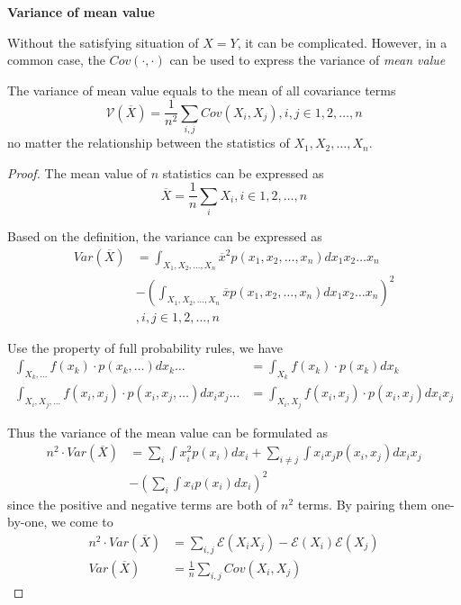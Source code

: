 \documentclass[../main.tex]{subfiles}
\begin{document}
\bigbreak
\textbf{Variance of mean value}

Without the satisfying situation of $X=Y$, it can be complicated.
However, in a common case, the $Cov(\cdot, \cdot)$ can be used to express the variance of \emph{mean value}
\begin{lemma}
    \label{Lemma: Variance of mean value}
    The variance of mean value equals to the mean of all covariance terms
    \begin{equation*}
        \mathcal{V}(\overline{X}) =
        \frac{1}{n^2} \sum_{i, j} Cov(X_i, X_j),
        i, j \in 1, 2, \dots, n
    \end{equation*}
    no matter the relationship between the statistics of $X_1, X_2, \dots, X_n$.

    \begin{proof}
        The mean value of $n$ statistics can be expressed as
        \begin{equation*}
            \overline{X} = \frac{1}{n} \sum_{i} X_i,
            i \in 1, 2, \dots, n
        \end{equation*}

        Based on the definition, the variance can be expressed as
        \begin{align*}
            Var(\overline{X}) & =  \int_{X_1, X_2, \dots, X_n} {\overline{x}}^2 p(x_1, x_2, \dots, x_n) dx_1 x_2 \dots x_n \\
                              & - (\int_{X_1, X_2, \dots, X_n} \overline{x} p(x_1, x_2, \dots, x_n) dx_1 x_2 \dots x_n)^2  \\
                              & , i, j \in 1, 2, \dots, n
        \end{align*}

        Use the property of full probability rules, we have
        \begin{align*}
            \int_{X_k, \dots} f(x_k) \cdot p(x_k, \dots) dx_k \dots                    & = \int_{X_k} f(x_k) \cdot p(x_k) dx_k                    \\
            \int_{X_i, X_j, \dots} f(x_i, x_j) \cdot p(x_i, x_j, \dots) dx_i x_j \dots & = \int_{X_i, X_j} f(x_i, x_j) \cdot p(x_i, x_j) dx_i x_j
        \end{align*}

        Thus the variance of the mean value can be formulated as
        \begin{align*}
            n^2 \cdot Var(\overline{X}) & = \sum_i \int x_i^2 p(x_i) dx_i + \sum_{i \neq j} \int x_i x_j p(x_i, x_j) dx_i x_j \\
                                        & - (\sum_i \int x_i p(x_i) dx_i)^2
        \end{align*}
        since the positive and negative terms are both of $n^2$ terms.
        By pairing them one-by-one, we come to
        \begin{align*}
            n^2 \cdot Var(\overline{X}) & = \sum_{i, j} \mathcal{E}(X_i X_j) - \mathcal{E}(X_i)\mathcal{E}(X_j) \\
            Var(\overline{X})           & = \frac{1}{n} \sum_{i, j} Cov(X_i, X_j)
        \end{align*}


\end{proof}
\end{lemma}
\end{document}
